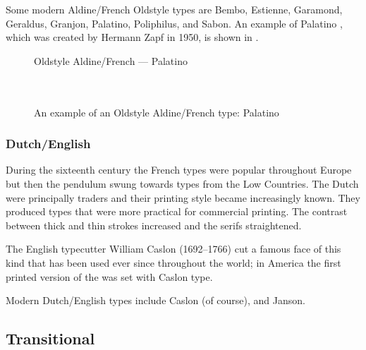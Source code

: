 \documentclass[10pt,letterpaper,extrafontsizes]{memoir}
\begin{document}
    Some modern Aldine/French Oldstyle types are 
Bembo, 
Estienne, 
Garamond, 
Geraldus, 
Granjon,
Palatino,  
Poliphilus, 
and Sabon.
An example of Palatino%
, 
which was created by Hermann Zapf
in 1950, is shown in .

\begin{figure}
\centering
{\centering{}\selectfont
  Oldstyle Aldine/French --- Palatino \\
  \UCalphabet \\
  \LCalphabet \\
  \fox\par}
\caption{An example of an Oldstyle Aldine/French type: Palatino} 
   \label{fig:palatino}
\end{figure}


\subsubsection{Dutch/English}

    During the sixteenth century the French types were popular throughout
Europe but then the pendulum swung towards types from the Low Countries.
The Dutch were principally traders and their printing style became 
increasingly known. They produced types that were more practical for
commercial printing. The contrast between thick and thin strokes increased
and the serifs straightened.

The English typecutter William Caslon (1692--1766) 
cut a famous face of this kind that has been used ever since throughout the 
world; in America the first printed version of the 
was set with Caslon type.

    Modern Dutch/English types include
Caslon (of course),
and Janson.

\subsection{Transitional}
\end{document}
